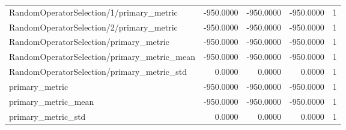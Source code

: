 \begin{table}[h]
\begin{tabular}{lrrrr}
RandomOperatorSelection/1/primary_metric & -950.0000 & -950.0000 & -950.0000 & 1 \\
RandomOperatorSelection/2/primary_metric & -950.0000 & -950.0000 & -950.0000 & 1 \\
RandomOperatorSelection/primary_metric & -950.0000 & -950.0000 & -950.0000 & 1 \\
RandomOperatorSelection/primary_metric_mean & -950.0000 & -950.0000 & -950.0000 & 1 \\
RandomOperatorSelection/primary_metric_std & 0.0000 & 0.0000 & 0.0000 & 1 \\
primary_metric & -950.0000 & -950.0000 & -950.0000 & 1 \\
primary_metric_mean & -950.0000 & -950.0000 & -950.0000 & 1 \\
primary_metric_std & 0.0000 & 0.0000 & 0.0000 & 1 \\
\hline
\end{tabular}
\end{table}